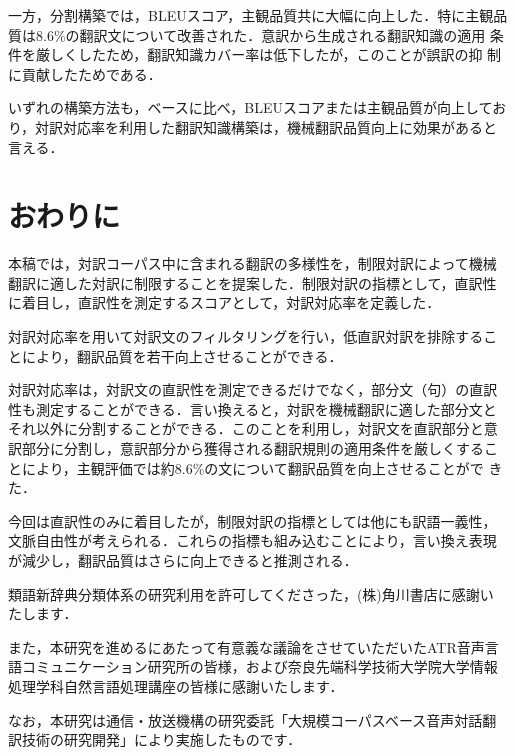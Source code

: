 一方，分割構築では，BLEUスコア，主観品質共に大幅に向上した．特に主観品
質は8.6\%の翻訳文について改善された．意訳から生成される翻訳知識の適用
条件を厳しくしたため，翻訳知識カバー率は低下したが，このことが誤訳の抑
制に貢献したためである．

いずれの構築方法も，ベースに比べ，BLEUスコアまたは主観品質が向上してお
り，対訳対応率を利用した翻訳知識構築は，機械翻訳品質向上に効果があると
言える．


\section{おわりに}

本稿では，対訳コーパス中に含まれる翻訳の多様性を，制限対訳によって機械
翻訳に適した対訳に制限することを提案した．制限対訳の指標として，直訳性
に着目し，直訳性を測定するスコアとして，対訳対応率を定義した．

対訳対応率を用いて対訳文のフィルタリングを行い，低直訳対訳を排除するこ
とにより，翻訳品質を若干向上させることができる．

対訳対応率は，対訳文の直訳性を測定できるだけでなく，部分文（句）の直訳
性も測定することができる．言い換えると，対訳を機械翻訳に適した部分文と
それ以外に分割することができる．このことを利用し，対訳文を直訳部分と意
訳部分に分割し，意訳部分から獲得される翻訳規則の適用条件を厳しくするこ
とにより，主観評価では約8.6\%の文について翻訳品質を向上させることがで
きた．

今回は直訳性のみに着目したが，制限対訳の指標としては他にも訳語一義性，
文脈自由性が考えられる．これらの指標も組み込むことにより，言い換え表現
が減少し，翻訳品質はさらに向上できると推測される．

\acknowledgment

類語新辞典分類体系の研究利用を許可してくださった，(株)角川書店に感謝い
たします．

また，本研究を進めるにあたって有意義な議論をさせていただいたATR音声言
語コミュニケーション研究所の皆様，および奈良先端科学技術大学院大学情報
処理学科自然言語処理講座の皆様に感謝いたします．

なお，本研究は通信・放送機構の研究委託「大規模コーパスベース音声対話翻
訳技術の研究開発」により実施したものです．


